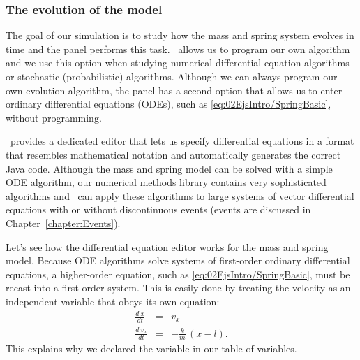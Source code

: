 \subsubsection{The evolution of the model}

The goal of our simulation is to study how the mass and spring system evolves in time and the  panel
performs this task.  \ejs\ allows us to program our own algorithm and we use this option when studying
numerical differential equation algorithms or stochastic (probabilistic) algorithms. Although we can always program our
own evolution algorithm, the  panel has a second option that allows us to enter ordinary differential
equations (ODEs), such as \eqref{eq:02EjsIntro/SpringBasic}, without programming.

\ejs\ provides a dedicated editor that lets us specify differential equations in a format that resembles mathematical
notation and automatically generates the correct Java code. Although the mass and spring model
can be solved with a simple ODE algorithm, our numerical methods library contains very sophisticated algorithms and \ejs\ can apply these algorithms to large systems of vector differential equations with or without discontinuous events (events are discussed in Chapter~\ref{chapter:Events}).

Let's see how the differential equation editor works for the mass and spring model. Because ODE algorithms solve
systems of first-order ordinary differential equations, a higher-order equation, such as
\eqref{eq:02EjsIntro/SpringBasic}, must be recast into a first-order system.   This is easily done by treating the
velocity as an independent variable that obeys its own equation:
\begin{eqnarray}
  \frac{d\ x} {dt} &=& v_x                  \label{eq:02EjsIntro/SpringBasicODE1} \\
  \frac{d\ v_x}{dt} &=& -\frac{k}{m}\,(x-l). \label{eq:02EjsIntro/SpringBasicODE2}
\end{eqnarray}
\noindent This explains why we declared the  variable in our table of variables.

